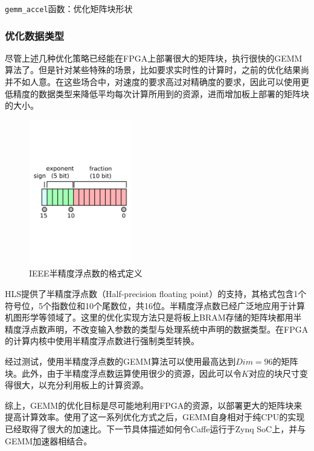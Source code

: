 \begin{listing}[!ht]

\caption{\texttt{gemm\_accel}函数：优化矩阵块形状}
\label{lst:gemmaccelopt}
\end{listing}

\subsubsection{优化数据类型}
尽管上述几种优化策略已经能在FPGA上部署很大的矩阵块，执行很快的GEMM算法了。但是针对某些特殊的场景，比如要求实时性的计算时，之前的优化结果尚并不如人意。在这些场合中，对速度的要求高过对精确度的要求，因此可以使用更低精度的数据类型来降低平均每次计算所用到的资源，进而增加板上部署的矩阵块的大小。

\begin{figure}[!ht]
\centering
\includegraphics[width=0.4\textwidth]{assets/imgs/half}
\caption{IEEE半精度浮点数的格式定义}
\end{figure}

HLS提供了半精度浮点数（Half-precision floating point）的支持，其格式包含1个符号位，5个指数位和10个尾数位，共16位。半精度浮点数已经广泛地应用于计算机图形学等领域了。这里的优化实现方法只是将板上BRAM存储的矩阵块都用半精度浮点数声明，不改变输入参数的类型与处理系统中声明的数据类型。在FPGA的计算内核中使用半精度浮点数进行强制类型转换。

经过测试，使用半精度浮点数的GEMM算法可以使用最高达到$Dim=96$的矩阵块。此外，由于半精度浮点数运算使用很少的资源，因此可以令$K$对应的块尺寸变得很大，以充分利用板上的计算资源。

综上，GEMM的优化目标是尽可能地利用FPGA的资源，以部署更大的矩阵块来提高计算效率。使用了这一系列优化方式之后，GEMM自身相对于纯CPU的实现已经取得了很大的加速比。下一节具体描述如何令Caffe运行于Zynq SoC上，并与GEMM加速器相结合。

